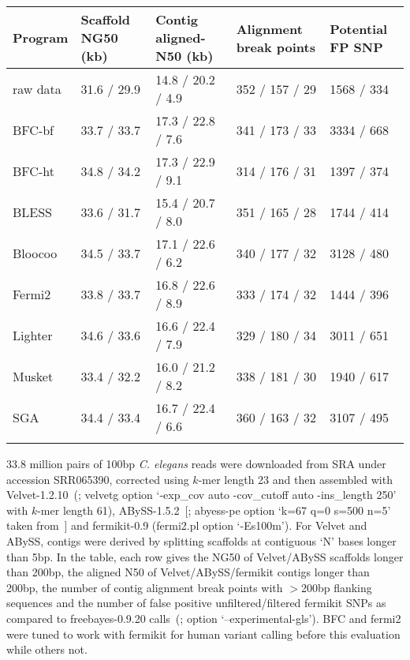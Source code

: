 \documentclass{bioinfo}
\begin{document}
\begin{table}[b]
{\footnotesize
\begin{tabular}{p{1.0cm}p{1.3cm}p{1.9cm}p{1.5cm}p{1.2cm}}
\toprule
Program   & Scaffold NG50 (kb) & Contig aligned-N50 (kb) & Alignment break points & Potential FP SNP\\
\midrule
raw data  & 31.6 / 29.9 & 14.8 / 20.2 / 4.9 & 352 / 157 / 29 & 1568 / 334\\
BFC-bf    & 33.7 / 33.7 & 17.3 / 22.8 / 7.6 & 341 / 173 / 33 & 3334 / 668\\
BFC-ht    & 34.8 / 34.2 & 17.3 / 22.9 / 9.1 & 314 / 176 / 31 & 1397 / 374\\
BLESS     & 33.6 / 31.7 & 15.4 / 20.7 / 8.0 & 351 / 165 / 28 & 1744 / 414\\
Bloocoo   & 34.5 / 33.7 & 17.1 / 22.6 / 6.2 & 340 / 177 / 32 & 3128 / 480\\
Fermi2    & 33.8 / 33.7 & 16.8 / 22.6 / 8.9 & 333 / 174 / 32 & 1444 / 396\\
Lighter   & 34.6 / 33.6 & 16.6 / 22.4 / 7.9 & 329 / 180 / 34 & 3011 / 651\\
Musket    & 33.4 / 32.2 & 16.0 / 21.2 / 8.2 & 338 / 181 / 30 & 1940 / 617\\
SGA       & 34.4 / 33.4 & 16.7 / 22.4 / 6.6 & 360 / 163 / 32 & 3107 / 495\\
\botrule
\end{tabular}}{33.8 million pairs of 100bp {\it C. elegans} reads were
downloaded from SRA under accession SRR065390, corrected using $k$-mer length
23 and then assembled with Velvet-1.2.10~(\citealp{Zerbino:2008uq}; velvetg
option `\mbox{-exp\_cov} auto \mbox{-cov\_cutoff} auto \mbox{-ins\_length} 250'
with $k$-mer length 61), ABySS-1.5.2~[\citealp{Simpson:2009ys}; abyess-pe
option `k=67 q=0 s=500 n=5' taken from~\citet{Simpson:2012aa}] and fermikit-0.9
(fermi2.pl option \mbox{`-Es100m'}). For Velvet and ABySS, contigs were derived
by splitting scaffolds at contiguous `N' bases longer than 5bp. In the table,
each row gives the NG50 of Velvet/ABySS scaffolds longer than 200bp, the
aligned N50 of Velvet/ABySS/fermikit contigs longer than 200bp, the number of
contig alignment break points with $>$200bp flanking sequences and the number
of false positive unfiltered/filtered fermikit SNPs as compared to
freebayes-0.9.20 calls~(\citealp{Garrison:2012aa}; option
`\mbox{--experimental-gls}'). BFC and fermi2 were tuned to work with fermikit
for human variant calling before this evaluation while others not.}
\end{table}
\end{document}
